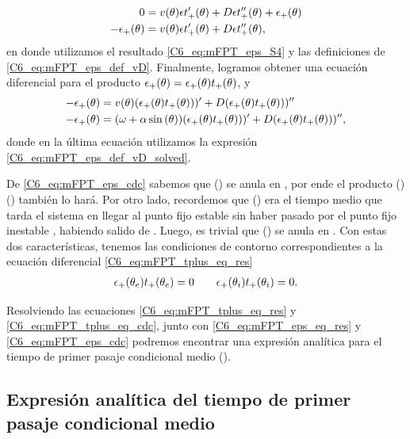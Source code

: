 \documentclass[./main.tex]{subfiles}
\begin{document}
\begin{align}
       0 &= v(\theta) \epsilon t_+'(\theta)  + D \epsilon t_+''(\theta) + \epsilon_{+}(\theta)\\
       -\epsilon_{+}(\theta) &= v(\theta) \epsilon t_+'(\theta)  + D \epsilon t_+''(\theta),
\end{align}
en donde utilizamos el resultado \ref{C6_eq:mFPT_eps_S4} y las definiciones de \ref{C6_eq:mFPT_eps_def_vD}.
Finalmente, logramos obtener una ecuación diferencial para el producto $\epsilon_{+}(\theta) = \epsilon_{+}(\theta) t_{+}(\theta)$, y
\begin{align}
       - \epsilon_{+}(\theta) &= v(\theta) (\epsilon_{+}(\theta) t_{+}(\theta)))'  + D (\epsilon_{+}(\theta) t_{+}(\theta)))''  \\
     - \epsilon_{+}(\theta) &= (\omega + \alpha \sin{(\ensuremath{\theta})}) (\epsilon_{+}(\theta) t_{+}(\theta)))'  + D (\epsilon_{+}(\theta) t_{+}(\theta)))'' ,
       \label{C6_eq:mFPT_tplus_eq_res}
\end{align}
donde en la última ecuación utilizamos la expresión  \ref{C6_eq:mFPT_eps_def_vD_solved}.

De \ref{C6_eq:mFPT_eps_cdc} sabemos que \epsplus(\xx) se anula en \xxi, por ende el producto \epsplus(\xx) \tplus(\xx) también lo hará. Por otro lado, recordemos que \tplus(\xx) era el tiempo medio que tarda el sistema en llegar al punto fijo estable \xxe sin haber pasado por el punto fijo inestable \xxi, habiendo salido de \xx. Luego, es trivial que \tplus(\xx) se anula en \xxe. Con estas dos características, tenemos las condiciones de contorno correspondientes a la ecuación diferencial \ref{C6_eq:mFPT_tplus_eq_res}
\begin{align}
    \epsilon_{+}(\theta_e) t_{+}(\theta_e) = 0 \qquad \epsilon_{+}(\theta_i) t_{+}(\theta_i) = 0 .
    \label{C6_eq:mFPT_tplus_eq_cdc}
\end{align}

Resolviendo las ecuaciones \ref{C6_eq:mFPT_tplus_eq_res} y \ref{C6_eq:mFPT_tplus_eq_cdc}, junto con \ref{C6_eq:mFPT_eps_eq_res} y \ref{C6_eq:mFPT_eps_cdc} podremos encontrar una expresión analítica para el tiempo de primer pasaje condicional medio \tplus(\xx). 


\subsection{Expresión analítica del tiempo de primer pasaje condicional medio}
\end{document}
